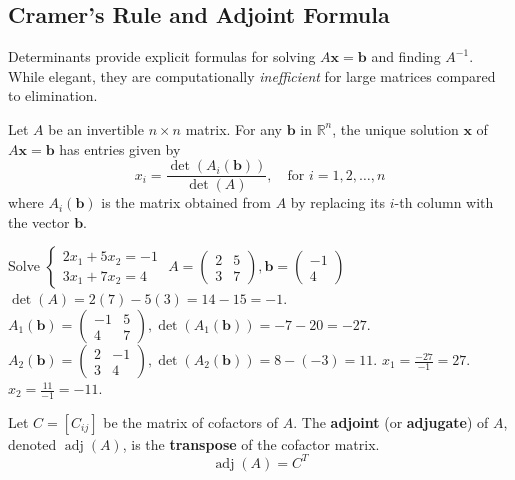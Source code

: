 \documentclass[oneside]{book}
\begin{document}
\subsection{Cramer's Rule and Adjoint Formula}

Determinants provide explicit formulas for solving $A\mathbf{x} = \mathbf{b}$ and finding $A^{-1}$. While elegant, they are computationally \emph{inefficient} for large matrices compared to elimination.

\begin{theorem}
Let $A$ be an invertible $n \times n$ matrix. For any $\mathbf{b}$ in $\mathbb{R}^n$, the unique solution $\mathbf{x}$ of $A\mathbf{x} = \mathbf{b}$ has entries given by
\[ x_i = \frac{\det(A_i(\mathbf{b}))}{\det(A)}, \quad \text{for } i = 1, 2, \ldots, n \]
where $A_i(\mathbf{b})$ is the matrix obtained from $A$ by replacing its $i$-th column with the vector $\mathbf{b}$.
\end{theorem}

\begin{example}
Solve $ \begin{cases} 2x_1 + 5x_2 = -1 \\ 3x_1 + 7x_2 = 4 \end{cases} $
$A = \begin{pmatrix} 2 & 5 \\ 3 & 7 \end{pmatrix}, \mathbf{b} = \begin{pmatrix} -1 \\ 4 \end{pmatrix}$
$\det(A) = 2(7) - 5(3) = 14 - 15 = -1$.
$A_1(\mathbf{b}) = \begin{pmatrix} -1 & 5 \\ 4 & 7 \end{pmatrix}, \det(A_1(\mathbf{b})) = -7 - 20 = -27$.
$A_2(\mathbf{b}) = \begin{pmatrix} 2 & -1 \\ 3 & 4 \end{pmatrix}, \det(A_2(\mathbf{b})) = 8 - (-3) = 11$.
$x_1 = \frac{-27}{-1} = 27$.
$x_2 = \frac{11}{-1} = -11$.
\end{example}

\begin{definition}
Let $C = [C_{ij}]$ be the matrix of cofactors of $A$. The \textbf{adjoint} (or \textbf{adjugate}) of $A$, denoted $\operatorname{adj}(A)$, is the \textbf{transpose} of the cofactor matrix.
\[ \operatorname{adj}(A) = C^T \]
\end{definition}
\end{document}
